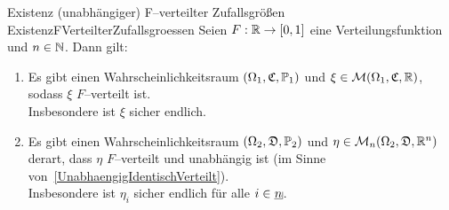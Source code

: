 \begin{lemma}{Existenz (unabh\"angiger) F--verteilter Zufallsgrößen}
             {ExistenzFVerteilterZufallsgroessen}
Seien $F: \mathbb{R} \rightarrow [0,1]$ eine Verteilungsfunktion und $n \in \mathbb{N}$.
Dann gilt:
\begin{enumerate}[(1)]
	\item \label{ExistenzFVerteilterZufallsgroessen1}
	Es gibt einen Wahrscheinlichkeitsraum $(\Omega_1, \mathfrak{C}, \mathbb{P}_1)$
	und $\xi \in \mathcal{M}(\Omega_1, \mathfrak{C}, \mathbb{R})$, sodass $\xi$ $F$--verteilt
	 ist.\\
	Insbesondere ist $\xi$ sicher endlich.
	\item \label{ExistenzFVerteilterZufallsgroessen2}
	Es gibt einen Wahrscheinlichkeitsraum $(\Omega_2, \mathfrak{D}, \mathbb{P}_2)$ und
	$\eta \in \mathcal{M}_n(\Omega_2, \mathfrak{D}, \mathbb{R}^n)$ derart, dass $\eta$ $F$--verteilt  
	und unabhängig ist (im Sinne von~\ref{UnabhaengigIdentischVerteilt}).\\
	Insbesondere ist $\eta_i$ sicher endlich für alle $i \in \haken n$.
\end{enumerate}
\end{lemma}
